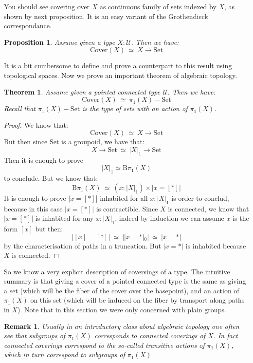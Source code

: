 \documentclass{article}
\newcommand{\U}{{\mathcal U}}
\renewcommand{\r}{\rightarrow}
\newcommand{\B}{\mathrm{B}}
\newcommand{\Set}{\mathrm{Set}}
\newtheorem{proposition}{Proposition}
\newtheorem{theorem}{Theorem}
\newtheorem{remark}{Remark}
\begin{document}
You should see covering over $X$ as continuous family of sets indexed by $X$, as shown by next proposition. It is an easy variant of the Grothendieck correspondance.

\begin{proposition}
Assume given a type $X:\U$. Then we have:
\[\mathrm{Cover}(X) \ \simeq\ X \r \Set\]
\end{proposition}

It is a bit cumbersome to define and prove a counterpart to this result using topological spaces. Now we prove an important theorem of algebraic topology.

\begin{theorem}
Assume given a pointed connected type $\U$. Then we have:
\[\mathrm{Cover}(X) \ \simeq\ \pi_1(X)-\Set\]
Recall that $\pi_1(X)-\Set$ is the type of sets with an action of $\pi_1(X)$.
\end{theorem}
\begin{proof}
We know that:
\[\mathrm{Cover}(X)\ \simeq\ X\r \Set\]
But then since $\Set$ is a groupoid, we have that:
\[X\r\Set \ \simeq\ |X|_1\r \Set\]
Then it is enough to prove 
\[|X|_1 \simeq \B\pi_1(X)\] 
to conclude. But we know that:
\[\B\pi_1(X) \ \simeq \ (x:|X|_1)\times |x=[*]|\]
It is enough to prove $|x=[*]]$ inhabited for all $x:|X|_1$ is order to conclud, because in this case $|x=[*]|$ is contractible.
Since $X$ is connected, we know that $|x=[*]|$ is inhabited for any $x:|X|_1$, indeed by induction we can assume $x$ is the form $[x]$ but then:
\[|[x]=[*]| \ \simeq \ ||x=*|_0| \ \simeq\ |x=*|\]
by the characterisation of paths in a truncation. But $|x=*|$ is inhabited because $X$ is connected.
\end{proof}

So we know a very explicit description of coversings of a type. The intuitive summary is that giving a cover of a pointed connected type is the same as giving a set (which will be the fiber of the cover over the basepoint), and an action of $\pi_1(X)$ on this set (which will be induced on the fiber by transport along paths in $X$). Note that in this section we were only concerned with plain groups.


\begin{remark}
Usually in an introductory class about algebraic topology one often see that subgroups of $\pi_1(X)$ corresponds to connected coverings of $X$. In fact connected coverings correspond to the so-called \emph{transitive} actions of $\pi_1(X)$, which in turn correspond to subgroups of $\pi_1(X)$
\end{remark}
\end{document}
